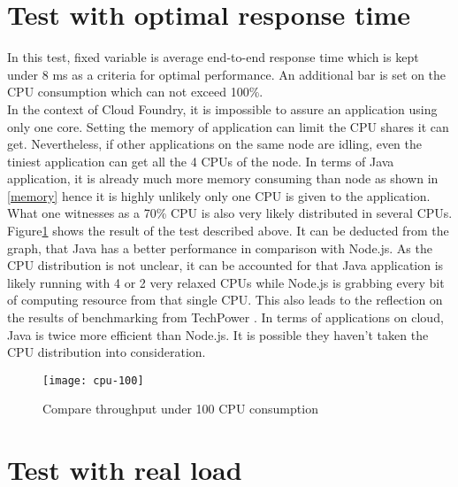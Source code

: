 \section{Test with optimal response time}
In this test, fixed variable is average end-to-end response time which is kept under 8 ms  as a criteria for optimal performance. An additional bar is set on the CPU consumption which can not exceed 100\%. \\
In the context of Cloud Foundry, it is impossible to assure an application using only one core. Setting the memory of application can limit the CPU shares it can get. Nevertheless, if other applications on the same node are idling, even the tiniest application can get all the 4 CPUs of the node. In terms of Java application, it is already much more memory consuming than node as shown in \ref{memory} hence it is highly unlikely only one CPU is given to the application. What one witnesses as a 70\% CPU is also very likely distributed in several CPUs.\\
Figure\ref{cpu-100} shows the result of the test described above. It can be deducted from the graph, that Java has a better performance in comparison with Node.js. As the CPU distribution is not unclear,  it can be accounted for that Java application is likely running with 4 or 2 very relaxed CPUs while Node.js is grabbing every bit of computing resource from that single CPU. This also leads to the reflection on the results of benchmarking from TechPower \citep{benchmark}. In terms of applications on cloud, Java is twice more efficient than Node.js. It is possible they haven't taken the CPU distribution into consideration. 

\begin{figure}[h]
	\centering
	\texttt{[image: cpu-100]}
	\caption{Compare throughput under 100 CPU consumption}
	\label{cpu-100}
\end{figure}

\section{Test with real load}
